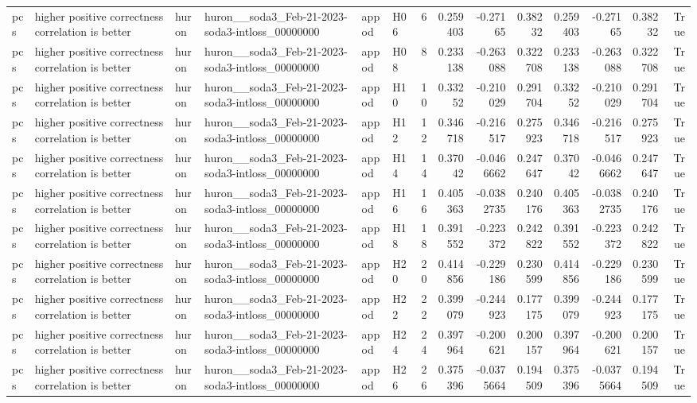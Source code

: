 \begin{longtable}{llllllrrrrrrrr}
pcs & higher positive correctness correlation is better & huron & huron\_\_soda3\_Feb-21-2023-soda3-intloss\_00000000 & appod & H06 & 6 & 0.259403 & -0.27165 & 0.38232 & 0.259403 & -0.27165 & 0.38232 & True \\
pcs & higher positive correctness correlation is better & huron & huron\_\_soda3\_Feb-21-2023-soda3-intloss\_00000000 & appod & H08 & 8 & 0.233138 & -0.263088 & 0.322708 & 0.233138 & -0.263088 & 0.322708 & True \\
pcs & higher positive correctness correlation is better & huron & huron\_\_soda3\_Feb-21-2023-soda3-intloss\_00000000 & appod & H10 & 10 & 0.33252 & -0.210029 & 0.291704 & 0.33252 & -0.210029 & 0.291704 & True \\
pcs & higher positive correctness correlation is better & huron & huron\_\_soda3\_Feb-21-2023-soda3-intloss\_00000000 & appod & H12 & 12 & 0.346718 & -0.216517 & 0.275923 & 0.346718 & -0.216517 & 0.275923 & True \\
pcs & higher positive correctness correlation is better & huron & huron\_\_soda3\_Feb-21-2023-soda3-intloss\_00000000 & appod & H14 & 14 & 0.37042 & -0.0466662 & 0.247647 & 0.37042 & -0.0466662 & 0.247647 & True \\
pcs & higher positive correctness correlation is better & huron & huron\_\_soda3\_Feb-21-2023-soda3-intloss\_00000000 & appod & H16 & 16 & 0.405363 & -0.0382735 & 0.240176 & 0.405363 & -0.0382735 & 0.240176 & True \\
pcs & higher positive correctness correlation is better & huron & huron\_\_soda3\_Feb-21-2023-soda3-intloss\_00000000 & appod & H18 & 18 & 0.391552 & -0.223372 & 0.242822 & 0.391552 & -0.223372 & 0.242822 & True \\
pcs & higher positive correctness correlation is better & huron & huron\_\_soda3\_Feb-21-2023-soda3-intloss\_00000000 & appod & H20 & 20 & 0.414856 & -0.229186 & 0.230599 & 0.414856 & -0.229186 & 0.230599 & True \\
pcs & higher positive correctness correlation is better & huron & huron\_\_soda3\_Feb-21-2023-soda3-intloss\_00000000 & appod & H22 & 22 & 0.399079 & -0.244923 & 0.177175 & 0.399079 & -0.244923 & 0.177175 & True \\
pcs & higher positive correctness correlation is better & huron & huron\_\_soda3\_Feb-21-2023-soda3-intloss\_00000000 & appod & H24 & 24 & 0.397964 & -0.200621 & 0.200157 & 0.397964 & -0.200621 & 0.200157 & True \\
pcs & higher positive correctness correlation is better & huron & huron\_\_soda3\_Feb-21-2023-soda3-intloss\_00000000 & appod & H26 & 26 & 0.375396 & -0.0375664 & 0.194509 & 0.375396 & -0.0375664 & 0.194509 & True \\

\end{longtable}
